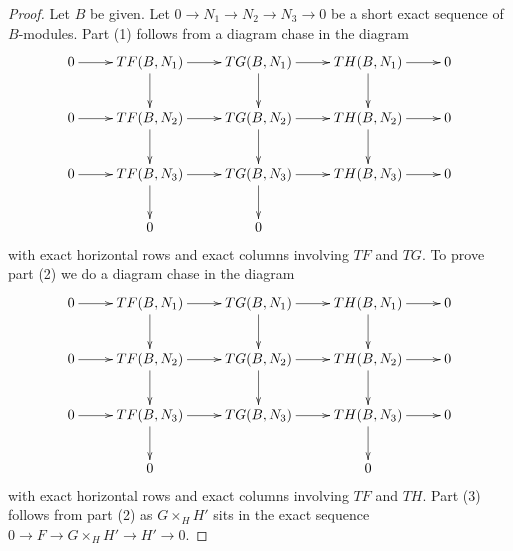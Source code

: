 \documentclass{stacks-project}
\theoremstyle{plain}
\theoremstyle{definition}
\theoremstyle{remark}
\numberwithin{equation}{subsection}
\begin{document}
\begin{proof}
Let $B$ be given. Let $0 \to N_1 \to N_2 \to N_3 \to 0$ be a short exact
sequence of $B$-modules. Part (1) follows from a diagram chase in
the diagram
$$
\xymatrix{
0 \ar[r] &
TF(B, N_1) \ar[r] \ar[d] &
TG(B, N_1) \ar[r] \ar[d] &
TH(B, N_1) \ar[r] \ar[d] & 0 \\
0 \ar[r] &
TF(B, N_2) \ar[r] \ar[d] &
TG(B, N_2) \ar[r] \ar[d] &
TH(B, N_2) \ar[r] \ar[d] & 0 \\
0 \ar[r] &
TF(B, N_3) \ar[r] \ar[d] &
TG(B, N_3) \ar[r] \ar[d] &
TH(B, N_3) \ar[r] & 0 \\
& 0 & 0
}
$$
with exact horizontal rows and exact columns involving $TF$ and $TG$.
To prove part (2) we do a diagram chase in the diagram
$$
\xymatrix{
0 \ar[r] &
TF(B, N_1) \ar[r] \ar[d] &
TG(B, N_1) \ar[r] \ar[d] &
TH(B, N_1) \ar[r] \ar[d] & 0 \\
0 \ar[r] &
TF(B, N_2) \ar[r] \ar[d] &
TG(B, N_2) \ar[r] \ar[d] &
TH(B, N_2) \ar[r] \ar[d] & 0 \\
0 \ar[r] &
TF(B, N_3) \ar[r] \ar[d] &
TG(B, N_3) \ar[r] &
TH(B, N_3) \ar[r] \ar[d] & 0 \\
& 0 & & 0
}
$$
with exact horizontal rows and exact columns involving $TF$ and $TH$.
Part (3) follows from part (2) as $G \times_H H'$ sits in the exact
sequence $0 \to F \to G \times_H H' \to H' \to 0$.
\end{proof}
\end{document}
